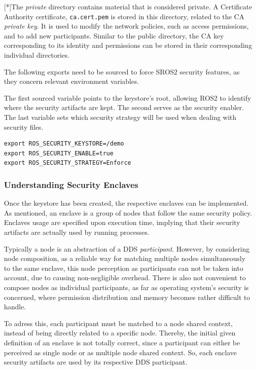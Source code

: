 [*]The \textit{private} directory contains material that is considered private. A Certificate Authority certificate, \texttt{ca.cert.pem} is stored in this directory, related to the CA \textit{private key}. It is used to modify the network policies, such as access permissions, and to add new participants. Similar to the public directory, the CA key corresponding to its identity and permissions can be stored in their corresponding individual directories.


The following exports need to be sourced to force SROS2 security features, as they concern relevant environment variables.

The first sourced variable points to the keystore's root, allowing ROS2 to identify where the security artifacts are kept. The second serves as the security enabler. The last variable sets which security strategy will be used when dealing with security files.
            
\begin{lstlisting}[title={SROS2 environment variables.}]
export ROS_SECURITY_KEYSTORE=/demo
export ROS_SECURITY_ENABLE=true
export ROS_SECURITY_STRATEGY=Enforce
\end{lstlisting}
            
\subsubsection{Understanding Security Enclaves}

Once the keystore has been created, the respective enclaves can be implemented. As mentioned, an enclave is a group of nodes that follow the same security policy. Enclaves usage are specified upon execution time, implying that their security artifacts are actually used by running processes.

Typically a node is an abstraction of a DDS \textit{participant}. However, by considering node composition, as a reliable way for matching multiple nodes simultaneously to the same enclave, this node perception as participants can not be taken into account, due to causing non-negligible overhead. There is also not convenient to compose nodes as individual participants, as far as operating system's security is concerned, where permission distribution and memory becomes rather difficult to handle.

To adress this, each participant must be matched to a node shared context, instead of being directly related to a specific node. Thereby, the initial given definition of an enclave is not totally correct, since a participant can either be perceived as single node or as multiple node shared context. So, each enclave security artifacts are used by its respective DDS participant. 

